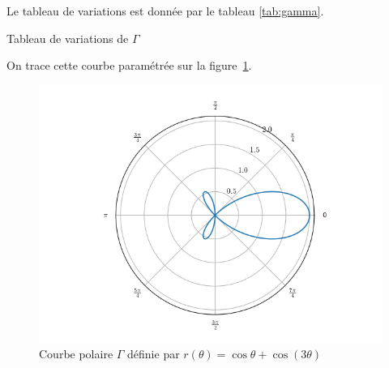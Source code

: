 Le tableau de variations est donnée par le tableau \ref{tab:gamma}.

\begin{table}
    \centering   
    \caption{Tableau de variations de $\Gamma$}
    \label{tab:gamma}
\end{table}

On trace cette courbe paramétrée sur la figure~\ref{fig:pol}.
\begin{figure}
 \centering
 \includegraphics[scale=0.85]{courbepolaire.png}
 \caption{Courbe polaire $\Gamma$ définie par \(r(\theta)=\cos\theta+\cos(3\theta)\)}
 \label{fig:pol}
\end{figure}
